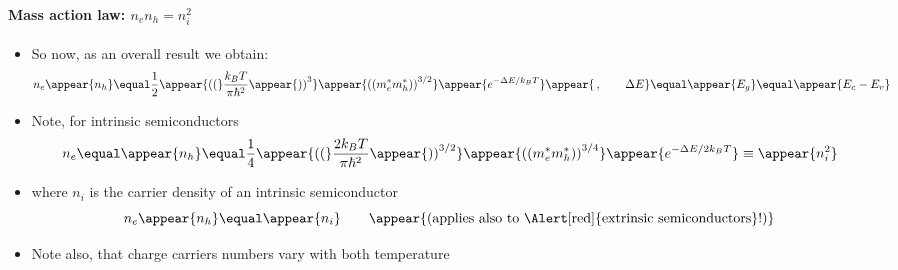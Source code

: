 \begin{frame}
\frametitle{\texorpdfstring{\culine[\sectiontitleulinecolor]{\sectiontitle}}{\sectiontitle} }
\framesubtitle{Mass action law: \quad $n_e n_h =n_i^2$}

\begin{itemize}
	\item So now, as an overall result we obtain:
\[
n_{e} \appear{n_{h}}  \equal \frac{1}{2} \appear{\textrm{((}} \frac{k_{B} T}{\pi \hbar^{2}} \appear{\textrm{))}^{3}} \appear{\textrm{((}m_{e}^{*} m_{h}^{*} \textrm{))}^{3 / 2}} \appear{e^{-\Delta E / k_{B} T}} \appear{\,, \qquad \Delta E}  \equal  \appear{E_g}  \equal  \appear{E_c - E_v}
\]

\item Note, for intrinsic semiconductors 
\[
n_{e}  \equal  \appear{n_{h}}  \equal  \frac{1}{4} \appear{\textrm{((}} \frac{2 k_{B} T}{\pi \hbar^{2}} \appear{\textrm{))}^{3 / 2}} \appear{\textrm{((}m_{e}^{*} m_{h}^{*} \textrm{))}^{3 / 4}} \appear{e^{-\Delta E / 2 k_{B} T}} \equiv \appear{n_i^2}
\]
\item[] where $n_i$ is the carrier density of an intrinsic semiconductor 
\[
n_{e} \appear{n_{h}}  \equal \appear{n_i} \qquad \appear{\textrm{(applies also to \Alert[red]{extrinsic semiconductors}!)}}
\]
\item Note also, that charge carriers numbers vary with both temperature 
\end{itemize}

\endofslide 
\end{frame}

